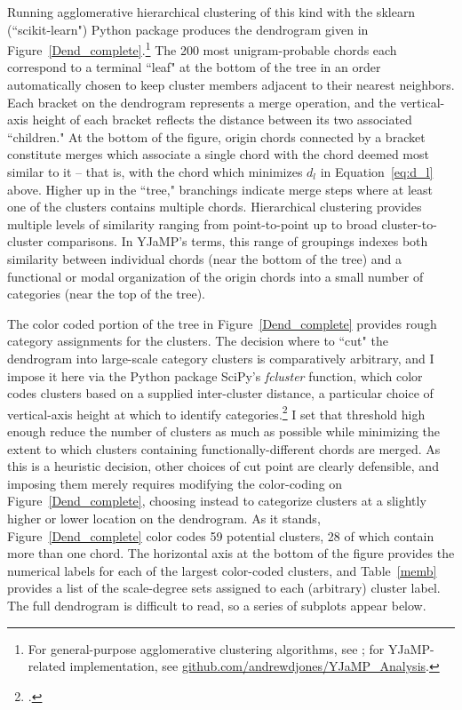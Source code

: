 Running agglomerative hierarchical clustering of this kind with the sklearn (``scikit-learn") Python package produces the dendrogram given in Figure~\ref{Dend_complete}.\footnote{For general-purpose agglomerative clustering algorithms, see \cite{scikit-learn}; for YJaMP-related implementation, see \href{github.com/andrewdjones/YJaMP_Analysis}{github.com/andrewdjones/YJaMP\_Analysis}.}  The 200 most unigram-probable chords each correspond to a terminal ``leaf" at the bottom of the tree in an order automatically chosen to keep cluster members adjacent to their nearest neighbors.  Each bracket on the dendrogram represents a merge operation, and the vertical-axis height of each bracket reflects the distance between its two associated ``children."  At the bottom of the figure, origin chords connected by a bracket constitute merges which associate a single chord with the chord deemed most similar to it -- that is, with the chord which minimizes $d_l$ in Equation~\ref{eq:d_l} above.  Higher up in the ``tree," branchings indicate merge steps where at least one of the clusters contains multiple chords.  Hierarchical clustering provides multiple levels of similarity ranging from point-to-point up to broad cluster-to-cluster comparisons.  In YJaMP's terms, this range of groupings indexes both similarity between individual chords (near the bottom of the tree) and a functional or modal organization of the origin chords into a small number of categories (near the top of the tree).

The color coded portion of the tree in Figure~\ref{Dend_complete} provides rough category assignments for the clusters.  The decision where to ``cut" the dendrogram into large-scale category clusters is comparatively arbitrary, and I impose it here via the Python package SciPy's \emph{fcluster} function, which color codes clusters based on a supplied inter-cluster distance, a particular choice of vertical-axis height at which to identify categories.\footnote{\cite{scipy}.}  I set that threshold high enough reduce the number of clusters as much as possible while minimizing the extent to which clusters containing functionally-different chords are merged.  As this is a heuristic decision, other choices of cut point are clearly defensible, and imposing them merely requires modifying the color-coding on Figure~\ref{Dend_complete}, choosing instead to categorize clusters at a slightly higher or lower location on the dendrogram.  As it stands, Figure~\ref{Dend_complete} color codes 59 potential clusters, 28 of which contain more than one chord.  The horizontal axis at the bottom of the figure provides the numerical labels for each of the largest color-coded clusters, and Table~\ref{memb} provides a list of the scale-degree sets assigned to each (arbitrary) cluster label.  The full dendrogram is difficult to read, so a series of subplots appear below.

